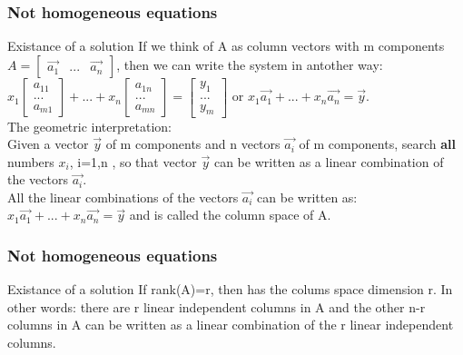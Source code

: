 \begin{frame}
	\frametitle{Not homogeneous equations}
	\begin{block}{Existance of a solution}
		If we think of A as column vectors with m components $A=\begin{bmatrix} \overrightarrow{a_1} & ... & \overrightarrow{a_n} \end{bmatrix}$, then we can write the system in antother way:\\
		$x_1\begin{bmatrix} a_{11} \\...\\a_{m1}\end{bmatrix} + ... + x_n \begin{bmatrix} a_{1n}\\...\\a_{mn} \end{bmatrix}= \begin{bmatrix}
		y_1\\...\\y_m
		\end{bmatrix}$ or $x_1\overrightarrow{a_1}+...+x_n\overrightarrow{a_n}=\overrightarrow{y}$. \\
		The geometric interpretation: \\
		Given a vector $\overrightarrow{y}$ of m components and n vectors $\overrightarrow{a_i}$ of m components, search {\bf all} numbers $x_i$, i=1,n , so that vector $\overrightarrow{y}$ can be written as a linear combination of the vectors $\overrightarrow{a_i}$.\\
		All the linear combinations of the vectors $\overrightarrow{a_i}$ can be written as: $x_1\overrightarrow{a_1}+...+x_n\overrightarrow{a_n}=\overrightarrow{y}$ and is called the column space of A. 
	\end{block}
\end{frame}

\begin{frame}
	\frametitle{Not homogeneous equations}
	\begin{block}{Existance of a solution}
		If rank(A)=r, then has the colums space dimension r. In other words: there are r linear independent columns in A and the other n-r columns in A can be written as a linear combination of the r linear independent columns. \\
	\end{block}
\end{frame}

